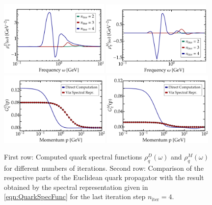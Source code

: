  \begin{figure}[t] 
\hfill
	\centering
	\includegraphics[width = 0.48\textwidth, trim= 4em 0 0 0]{figs/plots/rhoqDPlot}
\hfill
	\includegraphics[width = 0.48\textwidth, trim= 4em 0 0 0 0]{figs/plots/rhoqMPlot}
\hfill \\
\hfill
	\centering
	\includegraphics[width = 0.485\textwidth, trim= 3em 0 0 0]{figs/plots/BenchmarkPlotVec}
\hspace{0.5em}
	\includegraphics[width = 0.485\textwidth, trim= 3em 0 0 0]{figs/plots/BenchmarkPlotScal}
\hfill
	\caption[Computed quark spectral functions $\rho_q^D(\omega)$ and $\rho_q(\omega)$ and corresponding propagator dressings.]{First row: Computed quark spectral functions $\rho_q^D(\omega)$ and $\rho_q^M(\omega)$ for different numbers of iterations. Second row: Comparison of the respective parts of the Euclidean quark propagator with the result obtained by the spectral representation given in \eqref{eqn:QuarkSpecFunc} for the last iteration step $n_{\mathrm{iter}}=4$.}
\label{fig:specfunc_results}
\end{figure}

